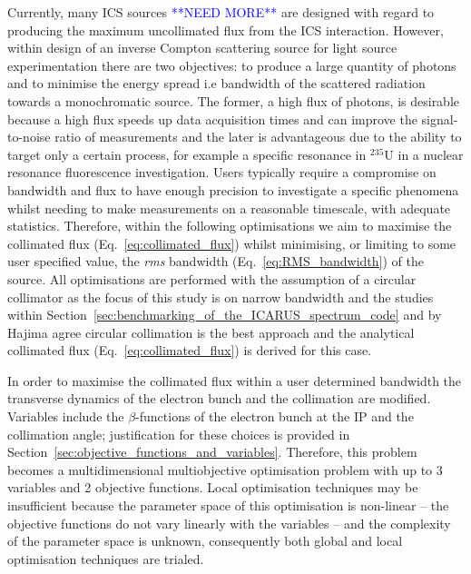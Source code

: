 \documentclass[../main.tex]{subfiles}
\begin{document}
Currently, many ICS sources \cite{deitrick2017inverse,deitrick2018high} \textcolor{blue}{**NEED MORE**} are designed with regard to producing the maximum uncollimated flux from the ICS interaction. However, within design of an inverse Compton scattering source for light source experimentation there are two objectives: to produce a large quantity of photons and to minimise the energy spread i.e bandwidth of the scattered radiation towards a monochromatic source. The former, a high flux of photons, is desirable because a high flux speeds up data acquisition times and can improve the signal-to-noise ratio of measurements and the later is advantageous due to the ability to target only a certain process, for example a specific resonance in $^{235}\mathrm{U}$ in a nuclear resonance fluorescence investigation. Users typically require a compromise on bandwidth and flux to have enough precision to investigate a specific phenomena whilst needing to make measurements on a reasonable timescale, with adequate statistics. Therefore, within the following optimisations we aim to maximise the collimated flux (Eq.~\ref{eq:collimated_flux}) whilst minimising, or limiting to some user specified value, the \textit{rms} bandwidth (Eq.~\ref{eq:RMS_bandwidth}) of the source. All optimisations are performed with the assumption of a circular collimator as the focus of this study is on narrow bandwidth and the studies within Section~\ref{sec:benchmarking_of_the_ICARUS_spectrum_code} and by Hajima \cite{hajima2021bandwidth} agree circular collimation is the best approach and the analytical collimated flux (Eq.~\ref{eq:collimated_flux}) is derived for this case.

In order to maximise the collimated flux within a user determined bandwidth the transverse dynamics of the electron bunch and the collimation are modified. Variables include the $\beta$-functions of the electron bunch at the IP and the collimation angle; justification for these choices is provided in Section~\ref{sec:objective_functions_and_variables}. Therefore, this problem becomes a multidimensional multiobjective optimisation problem with up to 3 variables and 2 objective functions. Local optimisation techniques may be insufficient because the parameter space of this optimisation is non-linear -- the objective functions do not vary linearly with the variables -- and the complexity of the parameter space is unknown, consequently both global and local optimisation techniques are trialed.
\end{document}
